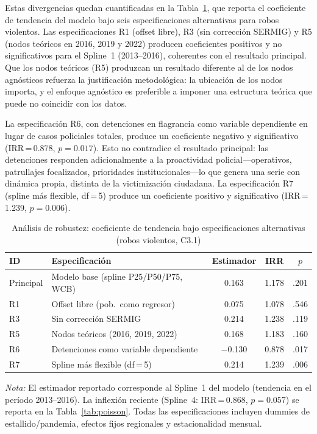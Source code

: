 \documentclass[12pt,a4paper]{article}
\newcommand{\tablenote}[1]{%
  \vspace{2pt}%
  \begin{minipage}{\linewidth}%
    \footnotesize\textit{Nota:} #1%
  \end{minipage}%
}
\begin{document}
Estas divergencias quedan cuantificadas en la Tabla~\ref{tab:robustez}, que reporta el coeficiente de tendencia del modelo bajo seis
especificaciones alternativas para robos violentos. Las especificaciones R1 (offset
libre), R3 (sin correcci\'on SERMIG) y R5 (nodos te\'oricos en 2016, 2019 y 2022)
producen coeficientes positivos y no significativos para el Spline~1 (2013--2016),
coherentes con el resultado principal. Que los nodos te\'oricos (R5) produzcan un
resultado diferente al de los nodos agn\'osticos refuerza la justificaci\'on metodol\'ogica:
la ubicaci\'on de los nodos importa, y el enfoque agn\'ostico es preferible a imponer
una estructura te\'orica que puede no coincidir con los datos.

La especificaci\'on R6, con detenciones en flagrancia como variable dependiente en lugar
de casos policiales totales, produce un coeficiente negativo y significativo
(IRR\,=\,0.878, $p=0.017$). Esto no contradice el resultado principal: las detenciones
responden adicionalmente a la proactividad policial---operativos, patrullajes focalizados,
prioridades institucionales---lo que genera una serie con din\'amica propia, distinta
de la victimizaci\'on ciudadana. La especificaci\'on R7 (spline m\'as flexible, df\,=\,5)
produce un coeficiente positivo y significativo (IRR\,=\,1.239, $p=0.006$).

\begin{table}[H]
\centering
\caption{An\'alisis de robustez: coeficiente de tendencia bajo especificaciones
alternativas (robos violentos, C3.1)}
\label{tab:robustez}
\small
\begin{tabular}{llccc}
\toprule
\textbf{ID} & \textbf{Especificaci\'on} & \textbf{Estimador} & \textbf{IRR} & $p$ \\
\midrule
Principal & Modelo base (spline P25/P50/P75, WCB) & 0.163 & 1.178 & .201 \\
\midrule
R1 & Offset libre (pob.\ como regresor)    & 0.075 & 1.078 & .546 \\
R3 & Sin correcci\'on SERMIG               & 0.214 & 1.238 & .119 \\
R5 & Nodos te\'oricos (2016, 2019, 2022)   & 0.168 & 1.183 & .160 \\
R6 & Detenciones como variable dependiente & $-$0.130 & 0.878 & .017 \\
R7 & Spline m\'as flexible (df\,=\,5)      & 0.214 & 1.239 & .006 \\
\bottomrule
\end{tabular}
\tablenote{El estimador reportado corresponde al Spline~1 del modelo (tendencia en el
per\'iodo 2013--2016). La inflexi\'on reciente (Spline~4: IRR\,=\,0.868, $p=0.057$) se
reporta en la Tabla~\ref{tab:poisson}. Todas las especificaciones incluyen dummies de
estallido/pandemia, efectos fijos regionales y estacionalidad mensual.}
\end{table}
\end{document}
